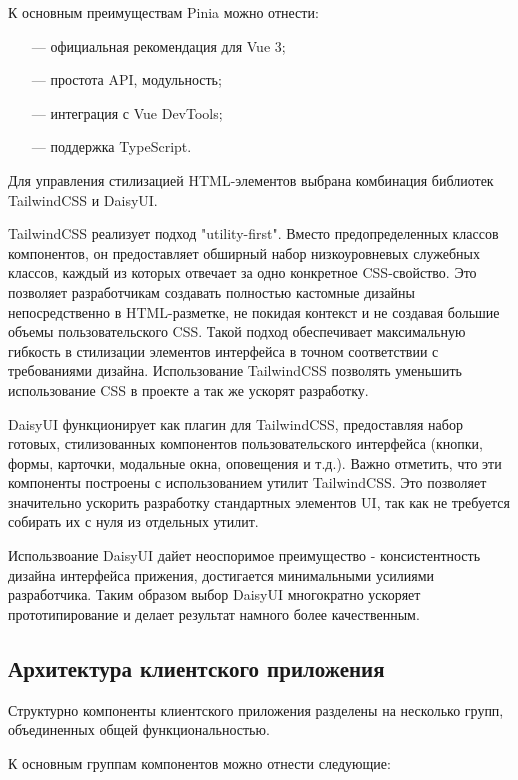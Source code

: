 К основным преимуществам Pinia можно отнести:

\begin{itemize}
\item[---]официальная рекомендация для Vue 3;
\item[---]простота API, модульность;
\item[---]интеграция с Vue DevTools;
\item[---]поддержка TypeScript.
\end{itemize}

Для управления стилизацией HTML-элементов выбрана комбинация библиотек TailwindCSS и DaisyUI.

TailwindCSS реализует подход "utility-first". Вместо предопределенных классов компонентов, он предоставляет обширный набор низкоуровневых служебных классов, каждый из которых отвечает за одно конкретное CSS-свойство. Это позволяет разработчикам создавать полностью кастомные дизайны непосредственно в HTML-разметке, не покидая контекст и не создавая большие объемы пользовательского CSS. Такой подход обеспечивает максимальную гибкость в стилизации элементов интерфейса в точном соответствии с требованиями дизайна. Использование TailwindCSS позволять уменьшить использование CSS в проекте а так же ускорят разработку.

DaisyUI функционирует как плагин для TailwindCSS, предоставляя набор готовых, стилизованных компонентов пользовательского интерфейса (кнопки, формы, карточки, модальные окна, оповещения и т.д.). Важно отметить, что эти компоненты построены с использованием утилит TailwindCSS. Это позволяет значительно ускорить разработку стандартных элементов UI, так как не требуется собирать их с нуля из отдельных утилит.

Использвоание DaisyUI дайет неоспоримое преимущество - консистентность дизайна интерфейса прижения, достигается минимальными усилиями разработчика. Таким образом выбор DaisyUI многократно ускоряет прототипирование и делает результат намного более качественным.

\subsection{Архитектура клиентского приложения}

Структурно компоненты клиентского приложения разделены на несколько групп, объединенных общей функциональностью.

К основным группам компонентов можно отнести следующие:

